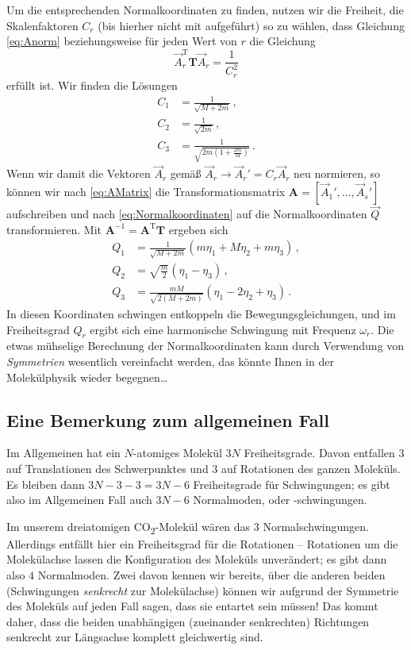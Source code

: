 \documentclass[paper=a4, fontsize=11.0pt, abstractoff, DIV12]{scrartcl}
\begin{document}
Um die entsprechenden Normalkoordinaten zu finden, nutzen wir die Freiheit, die
Skalenfaktoren $C_r$ (bis hierher nicht mit aufgeführt) so zu wählen, dass
Gleichung \eqref{eq:Anorm} beziehungsweise für jeden Wert von $r$ die Gleichung
\begin{equation}
\vec A_r^\mathrm{T}\mathbf{T}\vec A_r = \frac{1}{C_r^2}
\end{equation}
erfüllt ist. Wir finden die Lösungen
\begin{align}
C_1 &= \frac{1}{\sqrt{M+2m}}\,,\\
C_2 &= \frac{1}{\sqrt{2m}}\,,\\
C_3 &= \frac{1}{\sqrt{2m\left(1+\frac{2m}{M}\right)}}\,.
\end{align}
Wenn wir damit die Vektoren $\vec A_r$ gemäß $\vec A_r \to \vec A_r' = C_r
\vec A_r$ neu normieren, so können wir nach \eqref{eq:AMatrix} die
Transformationsmatrix $\mathbf A = [\vec A_1', \dots, \vec A_s']$
aufschreiben und nach \eqref{eq:Normalkoordinaten} auf die Normalkoordinaten
$\vec Q$ transformieren. Mit $\mathbf{A}^{-1}=\mathbf{A}^{\mathrm{T}}\mathbf{T}$
ergeben sich
\begin{align}
Q_1 &= \frac{1}{\sqrt{M+2m}}(m\eta_1 + M\eta_2 + m\eta_3)\,,\\
Q_2 &= \sqrt{\frac{m}{2}}(\eta_1 - \eta_3)\,,\\
Q_3 &= \frac{mM}{\sqrt{2(M+2m)}}(\eta_1 - 2\eta_2 + \eta_3)\,.
\end{align}
In diesen Koordinaten schwingen entkoppeln die Bewegungsgleichungen, und im
Freiheitsgrad $Q_r$ ergibt sich eine harmonische Schwingung mit Frequenz
$\omega_r$. Die etwas mühselige Berechnung der Normalkoordinaten kann durch
Verwendung von \emph{Symmetrien} wesentlich vereinfacht werden, das könnte
Ihnen in der Molekülphysik wieder begegnen\dots

\subsection{Eine Bemerkung zum allgemeinen Fall}

Im Allgemeinen hat ein $N$-atomiges Molekül $3N$ Freiheitsgrade. Davon
entfallen $3$ auf Translationen des Schwerpunktes und $3$ auf Rotationen des
ganzen Moleküls. Es bleiben dann $3N - 3 - 3 = 3N-6$ Freiheitsgrade für
Schwingungen; es gibt also im Allgemeinen Fall auch $3N - 6$ Normalmoden,
oder -schwingungen.

Im unserem dreiatomigen CO\textsubscript{2}-Molekül wären das $3$
Normalschwingungen. Allerdings entfällt hier ein Freiheitsgrad für die
Rotationen -- Rotationen um die Molekülachse lassen die Konfiguration des
Moleküls unverändert; es gibt dann also $4$ Normalmoden. Zwei davon kennen
wir bereits, über die anderen beiden (Schwingungen \emph{senkrecht} zur
Molekülachse) können wir aufgrund der Symmetrie des Moleküls auf jeden Fall
sagen, dass sie entartet sein müssen! Das kommt daher, dass die beiden
unabhängigen (zueinander senkrechten) Richtungen senkrecht zur Längsachse
komplett gleichwertig sind.
\end{document}
